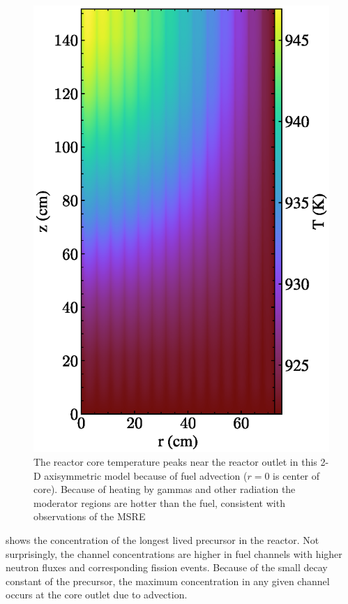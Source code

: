 \documentclass{article}
\begin{document}
\begin{figure}[htpb]
  \centering
  \includegraphics{2d_gamma_heating_temp.eps}
        \caption{The reactor core temperature peaks near the reactor outlet in
          this 2-D axisymmetric model because of fuel advection ($r=0$ is center
          of core). Because of heating by gammas and other radiation the
          moderator regions are hotter than the fuel, consistent with
          observations of the \gls{MSRE}}
  \label{fig:temp}
\end{figure}

 shows the concentration of the longest lived precursor in the
reactor. Not surprisingly, the channel concentrations are higher in fuel channels
with higher neutron fluxes and corresponding fission
events. Because of the small decay constant of the precursor, the maximum
concentration in any given channel occurs at the core outlet due to advection.
\end{document}
